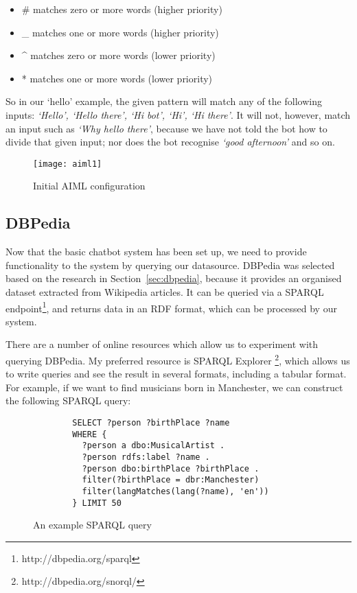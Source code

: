 \begin{itemize}
	\item \# matches zero or more words (higher priority)
	\item \_ matches one or more words (higher priority)
	\item \^{} matches zero or more words (lower priority)
	\item * matches one or more words (lower priority)
\end{itemize}

So in our `hello' example, the given pattern will match any of the following inputs: {\it{`Hello', `Hello there', `Hi bot', `Hi', `Hi there'}}. It will not, however, match an input such as {\it{`Why hello there'}}, because we have not told the bot how to divide that given input; nor does the bot recognise {\it{`good afternoon'}} and so on.

\begin{figure}[h]
	\centering
	\texttt{[image: aiml1]}
	\caption{Initial AIML configuration}
	\label{fig:aiml1}
\end{figure}

\subsection{DBPedia}
Now that the basic chatbot system has been set up, we need to provide functionality to the system by querying our datasource. DBPedia was selected based on the research in Section~\ref{sec:dbpedia}, because it provides an organised dataset extracted from Wikipedia articles. It can be queried via a SPARQL endpoint\footnote{http://dbpedia.org/sparql}, and returns data in an RDF format, which can be processed by our system.

There are a number of online resources which allow us to experiment with querying DBPedia. My preferred resource is SPARQL Explorer \footnote{http://dbpedia.org/snorql/}, which allows us to write queries and see the result in several formats, including a tabular format. For example, if we want to find musicians born in Manchester, we can construct the following SPARQL query:
\begin{figure}[h]
	\begin{lstlisting}
		SELECT ?person ?birthPlace ?name
		WHERE {
		  ?person a dbo:MusicalArtist .
		  ?person rdfs:label ?name .
		  ?person dbo:birthPlace ?birthPlace .
		  filter(?birthPlace = dbr:Manchester)
		  filter(langMatches(lang(?name), 'en'))
		} LIMIT 50 
	\end{lstlisting}
	\caption{An example SPARQL query}
	\label{fig:sparql1}
\end{figure}

